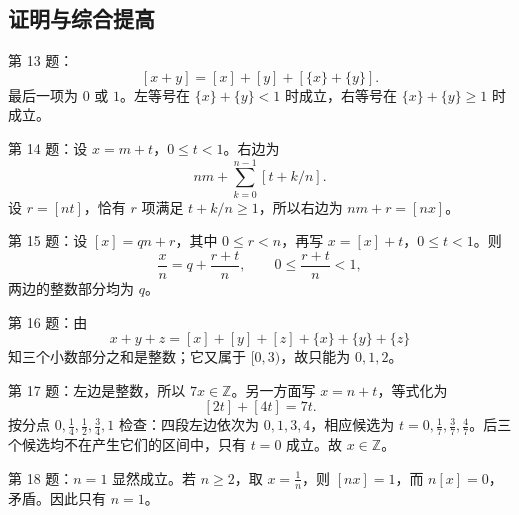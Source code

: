 \documentclass[11pt,a4paper,fontset=fandol]{ctexart}
\begin{document}
\subsection{证明与综合提高}
\begin{solution}第 13 题：
\[
[x+y]=[x]+[y]+[\{x\}+\{y\}].
\]
最后一项为 $0$ 或 $1$。左等号在 $\{x\}+\{y\}<1$ 时成立，右等号在 $\{x\}+\{y\}\ge1$ 时成立。\end{solution}
\begin{solution}第 14 题：设 $x=m+t$，$0\le t<1$。右边为
\[
nm+\sum_{k=0}^{n-1}[t+k/n].
\]
设 $r=[nt]$，恰有 $r$ 项满足 $t+k/n\ge1$，所以右边为 $nm+r=[nx]$。\end{solution}
\begin{solution}第 15 题：设 $[x]=qn+r$，其中 $0\le r<n$，再写 $x=[x]+t$，$0\le t<1$。则
\[
\frac{x}{n}=q+\frac{r+t}{n},\qquad0\le\frac{r+t}{n}<1,
\]
两边的整数部分均为 $q$。\end{solution}
\begin{solution}第 16 题：由
\[
x+y+z=[x]+[y]+[z]+\{x\}+\{y\}+\{z\}
\]
知三个小数部分之和是整数；它又属于 $[0,3)$，故只能为 $0,1,2$。\end{solution}
\begin{solution}第 17 题：左边是整数，所以 $7x\in\mathbb Z$。另一方面写 $x=n+t$，等式化为
\[
[2t]+[4t]=7t.
\]
按分点 $0,\frac14,\frac12,\frac34,1$ 检查：四段左边依次为 $0,1,3,4$，相应候选为 $t=0,\frac17,\frac37,\frac47$。后三个候选均不在产生它们的区间中，只有 $t=0$ 成立。故 $x\in\mathbb Z$。\end{solution}
\begin{solution}第 18 题：$n=1$ 显然成立。若 $n\ge2$，取 $x=\frac1n$，则 $[nx]=1$，而 $n[x]=0$，矛盾。因此只有 $n=1$。\end{solution}
\end{document}
